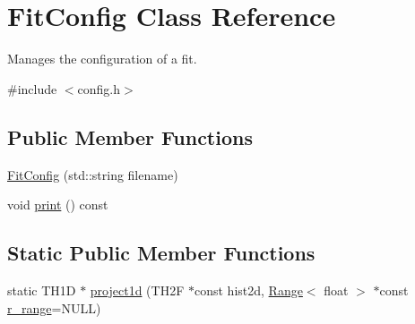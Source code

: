 \hypertarget{classFitConfig}{
\section{FitConfig Class Reference}
\label{classFitConfig}
}


Manages the configuration of a fit.  




{\ttfamily \#include $<$config.h$>$}

\subsection*{Public Member Functions}
\begin{DoxyCompactItemize}
\item 
\hyperlink{classFitConfig_af452a95ad4416b08111cffd41e2c8f5a}{FitConfig} (std::string filename)
\item 
void \hyperlink{classFitConfig_af39057bb8cece4c40f7f70afa139bbba}{print} () const 
\end{DoxyCompactItemize}
\subsection*{Static Public Member Functions}
\begin{DoxyCompactItemize}
\item 
static TH1D $\ast$ \hyperlink{classFitConfig_ad79c573a375545a767dcfc1b8baea5e6}{project1d} (TH2F $\ast$const hist2d, \hyperlink{structRange}{Range}$<$ float $>$ $\ast$const \hyperlink{classFitConfig_a5c73e875b6a5a15683837cf3e16e5658}{r\_\-range}=NULL)
\end{DoxyCompactItemize}
